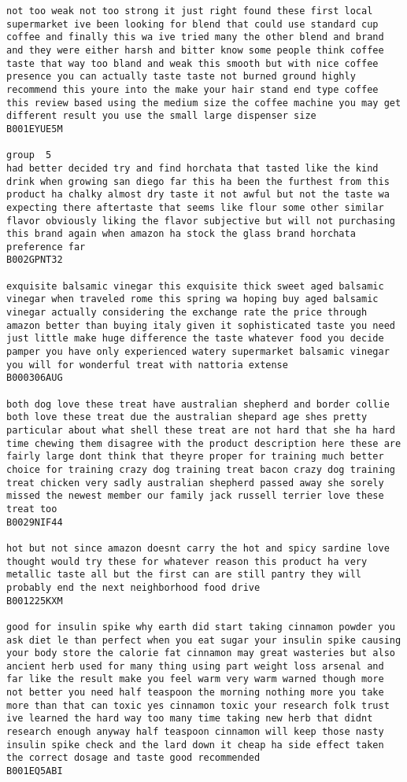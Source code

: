 \documentclass[11pt]{article}
\begin{document}
\begin{Verbatim}[commandchars=\\\{\}]
not too weak not too strong it just right found these first local supermarket ive been looking for blend that could use standard cup coffee and finally this wa ive tried many the other blend and brand and they were either harsh and bitter know some people think coffee taste that way too bland and weak this smooth but with nice coffee presence you can actually taste taste not burned ground highly recommend this youre into the make your hair stand end type coffee this review based using the medium size the coffee machine you may get different result you use the small large dispenser size
B001EYUE5M

group  5
had better decided try and find horchata that tasted like the kind drink when growing san diego far this ha been the furthest from this product ha chalky almost dry taste it not awful but not the taste wa expecting there aftertaste that seems like flour some other similar flavor obviously liking the flavor subjective but will not purchasing this brand again when amazon ha stock the glass brand horchata preference far
B002GPNT32

exquisite balsamic vinegar this exquisite thick sweet aged balsamic vinegar when traveled rome this spring wa hoping buy aged balsamic vinegar actually considering the exchange rate the price through amazon better than buying italy given it sophisticated taste you need just little make huge difference the taste whatever food you decide pamper you have only experienced watery supermarket balsamic vinegar you will for wonderful treat with nattoria extense
B000306AUG

both dog love these treat have australian shepherd and border collie both love these treat due the australian shepard age shes pretty particular about what shell these treat are not hard that she ha hard time chewing them disagree with the product description here these are fairly large dont think that theyre proper for training much better choice for training crazy dog training treat bacon crazy dog training treat chicken very sadly australian shepherd passed away she sorely missed the newest member our family jack russell terrier love these treat too
B0029NIF44

hot but not since amazon doesnt carry the hot and spicy sardine love thought would try these for whatever reason this product ha very metallic taste all but the first can are still pantry they will probably end the next neighborhood food drive
B001225KXM

good for insulin spike why earth did start taking cinnamon powder you ask diet le than perfect when you eat sugar your insulin spike causing your body store the calorie fat cinnamon may great wasteries but also ancient herb used for many thing using part weight loss arsenal and far like the result make you feel warm very warm warned though more not better you need half teaspoon the morning nothing more you take more than that can toxic yes cinnamon toxic your research folk trust ive learned the hard way too many time taking new herb that didnt research enough anyway half teaspoon cinnamon will keep those nasty insulin spike check and the lard down it cheap ha side effect taken the correct dosage and taste good recommended
B001EQ5ABI


\end{Verbatim}
\end{document}
